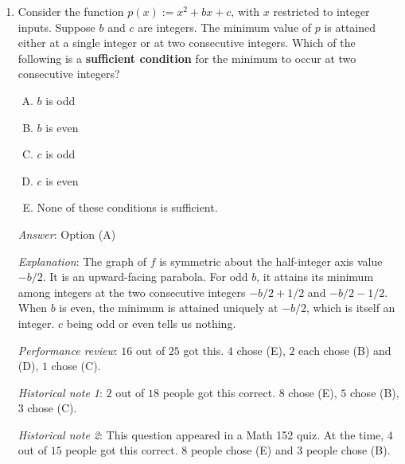 \documentclass[10pt]{amsart}
\begin{document}
\begin{enumerate}
\item Consider the function $p(x) := x^2 + bx + c$, with $x$
  restricted to integer inputs. Suppose $b$ and $c$ are integers. The
  minimum value of $p$ is attained either at a single integer or at
  two consecutive integers. Which of the following is a {\bf
  sufficient condition} for the minimum to occur at two consecutive
  integers?

  \begin{enumerate}[(A)]
  \item $b$ is odd
  \item $b$ is even
  \item $c$ is odd
  \item $c$ is even
  \item None of these conditions is sufficient.
  \end{enumerate}

  {\em Answer}: Option (A)

  {\em Explanation}: The graph of $f$ is symmetric about the
  half-integer axis value $-b/2$. It is an upward-facing parabola. For
  odd $b$, it attains its minimum among integers at the two
  consecutive integers $-b/2 + 1/2$ and $-b/2 - 1/2$. When $b$ is
  even, the minimum is attained uniquely at $-b/2$, which is itself an
  integer. $c$ being odd or even tells us nothing.

  {\em Performance review}: $16$ out of $25$ got this. $4$ chose (E),
  $2$ each chose (B) and (D), $1$ chose (C).

  {\em Historical note 1}: $2$ out of $18$ people got this
  correct. $8$ chose (E), $5$ chose (B), $3$ chose (C).

 {\em Historical note 2}: This question appeared in a Math 152 quiz. At
  the time, $4$ out of $15$ people got this correct. $8$ people chose
  (E) and $3$ people chose (B).

\end{enumerate}
\end{document}
